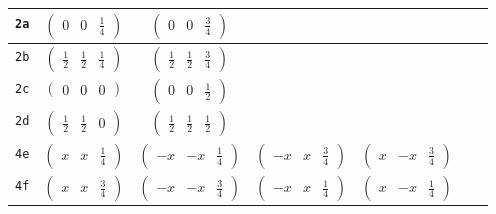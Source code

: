 \documentclass[fleqn,9pt,landscape]{jsarticle}
\begin{document}
\begin{center}
\begin{longtable}{ccccccc}
{\tt 2a} & $ \begin{pmatrix} 0 & 0 & \frac{1}{4} \end{pmatrix} $ & $ \begin{pmatrix} 0 & 0 & \frac{3}{4} \end{pmatrix} $ & $  $ & $  $ & $  $ & $  $ \\ \hline
{\tt 2b} & $ \begin{pmatrix} \frac{1}{2} & \frac{1}{2} & \frac{1}{4} \end{pmatrix} $ & $ \begin{pmatrix} \frac{1}{2} & \frac{1}{2} & \frac{3}{4} \end{pmatrix} $ & $  $ & $  $ & $  $ & $  $ \\ \hline
{\tt 2c} & $ \begin{pmatrix} 0 & 0 & 0 \end{pmatrix} $ & $ \begin{pmatrix} 0 & 0 & \frac{1}{2} \end{pmatrix} $ & $  $ & $  $ & $  $ & $  $ \\ \hline
{\tt 2d} & $ \begin{pmatrix} \frac{1}{2} & \frac{1}{2} & 0 \end{pmatrix} $ & $ \begin{pmatrix} \frac{1}{2} & \frac{1}{2} & \frac{1}{2} \end{pmatrix} $ & $  $ & $  $ & $  $ & $  $ \\ \hline
{\tt 4e} & $ \begin{pmatrix} x & x & \frac{1}{4} \end{pmatrix} $ & $ \begin{pmatrix} - x & - x & \frac{1}{4} \end{pmatrix} $ & $ \begin{pmatrix} - x & x & \frac{3}{4} \end{pmatrix} $ & $ \begin{pmatrix} x & - x & \frac{3}{4} \end{pmatrix} $ & $  $ & $  $ \\ \hline
{\tt 4f} & $ \begin{pmatrix} x & x & \frac{3}{4} \end{pmatrix} $ & $ \begin{pmatrix} - x & - x & \frac{3}{4} \end{pmatrix} $ & $ \begin{pmatrix} - x & x & \frac{1}{4} \end{pmatrix} $ & $ \begin{pmatrix} x & - x & \frac{1}{4} \end{pmatrix} $ & $  $ & $  $ \\ \hline

\end{longtable}
\end{center}
\end{document}

